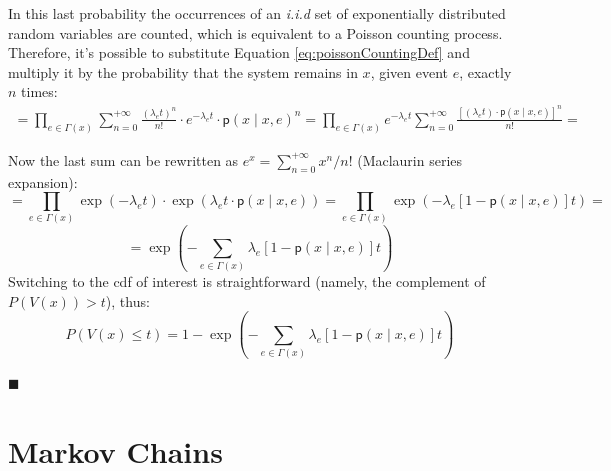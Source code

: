 \documentclass[12pt,a4paper]{article}
\newcommand*{\transp}{\mathsf{p}}
\begin{document}
\noindent
In this last probability the occurrences of an \textit{i.i.d} set of exponentially distributed random variables are counted, which is equivalent to a Poisson counting process. Therefore, it's possible to substitute Equation \ref{eq:poissonCountingDef} and multiply it by the probability that the system remains in $x$, given event $e$, exactly $n$ times:
\begin{equation*}
\begin{split}
=\prod_{e\in\Gamma(x)}\sum_{n=0}^{+\infty}
\frac{\left(\lambda_e t\right)^{n}}{n!} \cdot e^{-\lambda_e t} \cdot \transp\left( x \mid x,e\right)^{n}
=\prod_{e\in\Gamma(x)}e^{-\lambda_e t}\sum_{n=0}^{+\infty} \frac{\left[(\lambda_e t)\cdot \transp (x \mid x,e)\right]^n}{n!}
=
\end{split}
\end{equation*}

\noindent
Now the last sum can be rewritten as $e^x=\sum_{n=0}^{+\infty}x^n/n!$ (Maclaurin series expansion):
\begin{equation*}
=\prod_{e\in\Gamma(x)}\exp(-\lambda_e t) \cdot
\exp(\lambda_e t \cdot \transp\left(x \mid x,e\right))
=\prod_{e\in\Gamma(x)}\exp(-\lambda_e \left[1 - \transp(x \mid x,e)\right] t)=
\end{equation*}
$$
= \exp\left(- \sum_{e\in\Gamma(x)} \lambda_e \left[1 - \transp(x \mid x,e)\right] t\right)
$$
\noindent
Switching to the cdf of interest is straightforward (namely, the complement of $P(V(x)) > t$), thus:
\begin{equation*}
P\left(V(x)\leq t\right)=1- \exp\left(- \sum_{e\in\Gamma(x)} \lambda_e \left[1 - \transp(x \mid x,e)\right] t\right)
\end{equation*}
\begin{flushright}
$\blacksquare$
\end{flushright}
\newpage
\section{Markov Chains}
\label{sec:MC}
\end{document}
